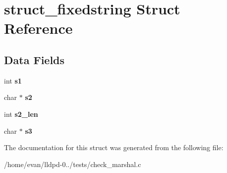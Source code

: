 \section{struct\-\_\-fixedstring \-Struct \-Reference}
\label{structstruct__fixedstring}
\subsection*{\-Data \-Fields}
\begin{DoxyCompactItemize}
\item 
int {\bfseries s1}\label{structstruct__fixedstring_acfb6b9e2b00e34da4313b463c341e597}

\item 
char $\ast$ {\bfseries s2}\label{structstruct__fixedstring_a96d0c5c02558b19c89e9d62b94866c7c}

\item 
int {\bfseries s2\-\_\-len}\label{structstruct__fixedstring_ae86c57940f05ca3af76a158f9f4f3dd0}

\item 
char $\ast$ {\bfseries s3}\label{structstruct__fixedstring_a45baae5e311f7584535786be786c6600}

\end{DoxyCompactItemize}


\-The documentation for this struct was generated from the following file\-:\begin{DoxyCompactItemize}
\item 
/home/evan/lldpd-\/0../tests/check\-\_\-marshal.\-c\end{DoxyCompactItemize}
